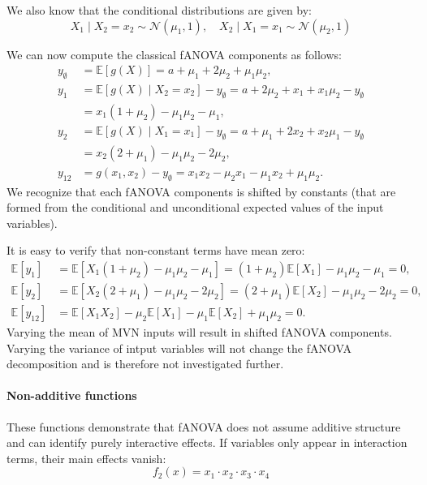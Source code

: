 We also know that the conditional distributions are given by:
\[
X_1 \mid X_2 = x_2 \sim \mathcal{N}(\mu_1, 1), \quad
X_2 \mid X_1 = x_1 \sim \mathcal{N}(\mu_2, 1)
\]

We can now compute the classical fANOVA components as follows:
\begin{align*}
    y_{\emptyset} &= \mathbb{E}[g(X)] = a + \mu_1 + 2\mu_2 + \mu_1 \mu_2, \\
    y_1 &= \mathbb{E}[g(X) \mid X_2 = x_2] - y_{\emptyset}= a + 2\mu_2 + x_1 + x_1 \mu_2 - y_{\emptyset} \\
    &= x_1 ( 1 + \mu_2) - \mu_1 \mu_2 - \mu_1, \\
    y_2 &= \mathbb{E}[g(X) \mid X_1 = x_1] - y_{\emptyset} = a + \mu_1 + 2x_2 + x_2 \mu_1 - y_{\emptyset} \\
    &= x_2 (2 + \mu_1) - \mu_1 \mu_2 - 2 \mu_2, \\
    y_{12} &= g(x_1, x_2) - y_{\emptyset} = x_1x_2 - \mu_2 x_1 - \mu_1 x_2 + \mu_1 \mu_2.      
\end{align*}
We recognize that each fANOVA components is shifted by constants (that are formed from the conditional and unconditional expected values of the input variables). 

It is easy to verify that non-constant terms have mean zero:
\begin{align*}
    \mathbb{E}[y_1] &= \mathbb{E}[X_1 (1 + \mu_2) - \mu_1 \mu_2 - \mu_1] = (1 + \mu_2) \mathbb{E}[X_1] - \mu_1 \mu_2 - \mu_1 = 0, \\
    \mathbb{E}[y_2] &= \mathbb{E}[X_2 (2 + \mu_1) - \mu_1 \mu_2 - 2\mu_2] = (2 + \mu_1) \mathbb{E}[X_2] - \mu_1 \mu_2 - 2\mu_2 = 0, \\
    \mathbb{E}[y_{12}] &= \mathbb{E}[X_1X_2] - \mu_2 \mathbb{E}[X_1] - \mu_1 \mathbb{E}[X_2] + \mu_1 \mu_2 = 0.
\end{align*}
Varying the mean of MVN inputs will result in shifted fANOVA components. Varying the variance of intput variables will not change the fANOVA decomposition and is therefore not investigated further.

\paragraph{Non-additive functions}
These functions demonstrate that fANOVA does not assume additive structure and can identify purely interactive effects. If variables only appear in interaction terms, their main effects vanish:
\[
f_2(x) = x_1 \cdot x_2 \cdot x_3 \cdot x_4
\]


